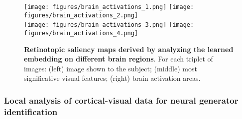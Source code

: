 \documentclass[10pt,journal,compsoc,twocolumn]{IEEEtran}
\begin{document}
\begin{figure*}
\centering
\texttt{[image: figures/brain\_activations\_1.png]} \hspace{0.3cm}
\texttt{[image: figures/brain\_activations\_2.png]}\\ \vspace{0.3cm}
\texttt{[image: figures/brain\_activations\_3.png]} \hspace{0.3cm}
\texttt{[image: figures/brain\_activations\_4.png]}
\caption{\textbf{Retinotopic saliency maps derived by analyzing the learned embedding on different brain regions}. For each triplet of images: (left) image shown to the subject; (middle) most significative visual features; (right) brain activation areas. }
\label{fig:eeg_channel_results}
\end{figure*}

\subsubsection{Local analysis of cortical-visual data for neural generator identification}
\end{document}
